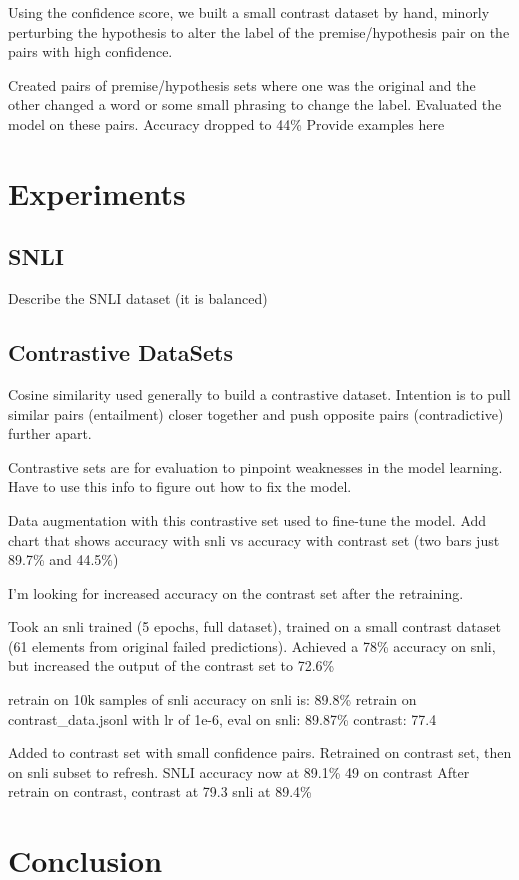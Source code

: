 \documentclass[11pt]{article}
\begin{document}
Using the confidence score, we built a small contrast dataset by hand, minorly perturbing the hypothesis to alter the label of the premise/hypothesis pair on the pairs with high confidence.   

Created pairs of premise/hypothesis sets where one was the original and the other changed a word or some small phrasing to change the label. Evaluated the model on these pairs. Accuracy dropped to 44\%  Provide examples here

\section{Experiments}
\subsection{SNLI}

Describe the SNLI dataset (it is balanced) \citealp{dataAug}

\subsection{Contrastive DataSets}

Cosine similarity used generally to build a contrastive dataset. Intention is to pull similar pairs (entailment) closer together and push opposite pairs (contradictive) further apart.

Contrastive sets are for evaluation to pinpoint weaknesses in the model learning. Have to use this info to figure out how to fix the model.

Data augmentation with this contrastive set used to fine-tune the model.
Add chart that shows accuracy with snli vs accuracy with contrast set (two bars just 89.7\% and 44.5\%)

I'm looking for increased accuracy on the contrast set after the retraining.

Took an snli trained (5 epochs, full dataset), trained on a small contrast dataset (61 elements from original failed predictions).  Achieved a 78\% accuracy on snli, but increased the output of the contrast set to 72.6\%

retrain on 10k samples of snli accuracy on snli is: 89.8\%
retrain on contrast\_data.jsonl with lr of 1e-6, eval on snli: 89.87\%  contrast: 77.4

Added to contrast set with small confidence pairs. Retrained on contrast set, then on snli subset to refresh. SNLI accuracy now at 89.1\% 49 on contrast
After retrain on contrast, contrast at 79.3 snli at 89.4\%

\section{Conclusion}



\end{document}
